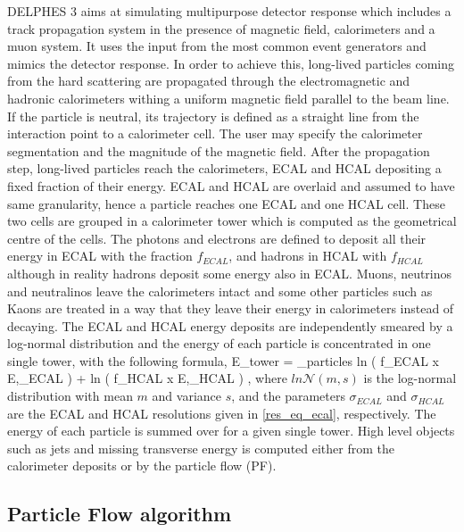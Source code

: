 DELPHES 3 aims at simulating multipurpose detector response which includes a track propagation system in the presence of magnetic field, calorimeters and a muon system. It uses the input from the most common event generators and mimics the detector response. In order to achieve this, long-lived particles coming from the hard scattering are propagated through the electromagnetic and hadronic calorimeters withing a uniform magnetic field parallel to the beam line. If the particle is neutral, its trajectory is defined as a straight line from the interaction point to a calorimeter cell. The user may specify the calorimeter segmentation and the magnitude of the magnetic field. After the propagation step, long-lived particles reach the calorimeters, ECAL and HCAL depositing a fixed fraction of their energy. ECAL and HCAL are overlaid and assumed to have same granularity, hence a particle reaches one ECAL and one HCAL cell. These two cells are grouped in a calorimeter tower which is computed as the geometrical centre of the cells. The photons and electrons are defined to deposit all their energy in ECAL with the fraction $f_{ECAL}$, and hadrons in HCAL with $f_{HCAL}$ although in reality hadrons deposit some energy also in ECAL. Muons, neutrinos and neutralinos leave the calorimeters intact and some other particles such as Kaons are treated in a way that they leave their energy in calorimeters instead of decaying. The ECAL and HCAL energy deposits are independently smeared by a log-normal distribution and the energy of each particle is concentrated in one single tower, with the following formula,
\be
E_{tower} = \sum_{particles} ln \left( f_{ECAL} \; x \; E,\sigma_{ECAL} \right) + ln \left( f_{HCAL} \; x \; E,\sigma_{HCAL} \right) \; ,
\ee
where $ln\mathcal{N}\left(m,s\right)$ is the log-normal distribution with mean $m$ and variance $s$, and the parameters $\sigma_{ECAL}$ and $\sigma_{HCAL}$ are the ECAL and HCAL resolutions given in \autoref{res_eq_ecal}, respectively. The energy of each particle is summed over for a given single tower. High level objects such as jets and missing transverse energy is computed either from the calorimeter deposits or by the particle flow (PF).

\subsection{Particle Flow algorithm}\label{pf_section}

